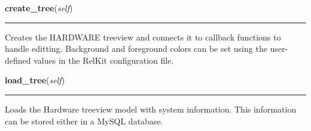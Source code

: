     \label{reliafree:hardware:Hardware:create_tree}

    \vspace{0.5ex}

\hspace{.8\funcindent}\begin{boxedminipage}{\funcwidth}

    \raggedright \textbf{create\_tree}(\textit{self})

    \vspace{-1.5ex}

    \rule{\textwidth}{0.5\fboxrule}
\setlength{\parskip}{2ex}
    Creates the HARDWARE treeview and connects it to callback functions to 
    handle editting.  Background and foreground colors can be set using the
    user-defined values in the RelKit configuration file.

\setlength{\parskip}{1ex}
    \end{boxedminipage}

    \label{reliafree:hardware:Hardware:load_tree}

    \vspace{0.5ex}

\hspace{.8\funcindent}\begin{boxedminipage}{\funcwidth}

    \raggedright \textbf{load\_tree}(\textit{self})

    \vspace{-1.5ex}

    \rule{\textwidth}{0.5\fboxrule}
\setlength{\parskip}{2ex}
    Loads the Hardware treeview model with system information. This 
    information can be stored either in a MySQL database.

\setlength{\parskip}{1ex}
    \end{boxedminipage}

    \label{reliafree:hardware:Hardware:save_hardware}

    \vspace{0.5ex}

